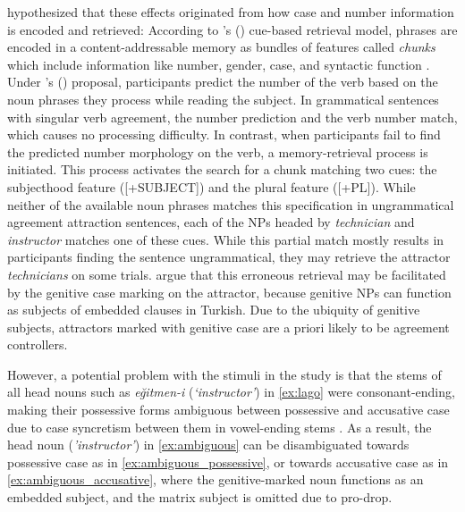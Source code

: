 \documentclass[]{interact}
\theoremstyle{plain}%
\theoremstyle{definition}
\theoremstyle{remark}
\begin{document}
\citet{LagoEtAl:2019} hypothesized that these effects originated from how case and number information is encoded and retrieved: According to \citeauthor{LewisVasishth:2005}'s (\citeyear{LewisVasishth:2005}) cue-based retrieval model, phrases are encoded in a content-addressable memory as bundles of features called \textit{chunks} which include information like number, gender, case, and syntactic function \citep[e.g.,][]{SmithVasishth:2020}. Under \citeauthor{LagoEtAl:2019}'s (\citeyear{LagoEtAl:2019}) proposal, participants predict the number of the verb based on the noun phrases they process while reading the subject. In grammatical sentences with singular verb agreement, the number prediction and the verb number match, which causes no processing difficulty. In contrast, when participants fail to find the predicted number morphology on the verb, a memory-retrieval process is initiated. This process activates the search for a chunk matching two cues: the subjecthood feature ([+SUBJECT]) and the plural feature ([+PL]). While neither of the available noun phrases matches this specification in ungrammatical agreement attraction sentences, each of the NPs headed by \textit{technician} and \textit{instructor} matches one of these cues. While this partial match mostly results in participants finding the sentence ungrammatical, they may retrieve the attractor \textit{technicians} on some trials. \citet{LagoEtAl:2019} argue that this erroneous retrieval may be facilitated by the genitive case marking on the attractor, because genitive NPs can function as subjects of embedded clauses in Turkish. Due to the ubiquity of genitive subjects, attractors marked with genitive case are a priori likely to be agreement controllers.

However, a potential problem with the stimuli in the \citet{LagoEtAl:2019} study is that the stems of all head nouns such as \textit{e\u{g}itmen-i} (\textit{`instructor'}) in \ref{ex:lago} were consonant-ending, making their possessive forms ambiguous between possessive and accusative case due to case syncretism between them in vowel-ending stems \citep[pp. 66--67]{GokselKerslake:2005}. As a result, the head noun (\textit{'instructor'}) in \ref{ex:ambiguous} can be disambiguated towards possessive case as in \ref{ex:ambiguous_possessive}, or towards accusative case as in \ref{ex:ambiguous_accusative}, where the genitive-marked noun functions as an embedded subject, and the matrix subject is omitted due to pro-drop.
\end{document}
